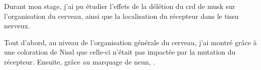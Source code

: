 	Durant mon stage, j'ai pu étudier l'effets de la délétion du \gls{crd} de \gls{musk} sur l'organisation du cerveau, ainsi que la localisation du récepteur dans le tissu nerveux.
	
	Tout d'abord, au niveau de l'organisation générale du cerveau, j'ai montré grâce à une coloration de Nissl que celle-ci n'était pas impactée par la mutation du récepteur. Ensuite, grâce au marquage de \gls{neun}, .
	
	